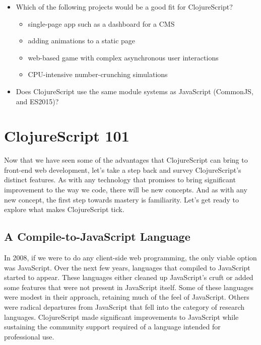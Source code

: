 \documentclass[10pt,twoside,openright]{memoir}
\begin{document}
\begin{itemize}
\tightlist
\item
  Which of the following projects would be a good fit for ClojureScript?

  \begin{itemize}
  \tightlist
  \item
    single-page app such as a dashboard for a CMS
  \item
    adding animations to a static page
  \item
    web-based game with complex asynchronous user interactions
  \item
    CPU-intensive number-crunching simulations
  \end{itemize}
\item
  Does ClojureScript use the same module systems as JavaScript
  (CommonJS, and ES2015)?
\end{itemize}

\section{ClojureScript 101}

Now that we have seen some of the advantages that ClojureScript can
bring to front-end web development, let's take a step back and survey
ClojureScript's distinct features. As with any technology that promises
to bring significant improvement to the way we code, there will be new
concepts. And as with any new concept, the first step towards mastery is
familiarity. Let's get ready to explore what makes ClojureScript tick.

\subsection{A Compile-to-JavaScript Language}

In 2008, if we were to do any client-side web programming, the only
viable option was JavaScript. Over the next few years, languages that
compiled to JavaScript started to appear. These languages either cleaned
up JavaScript's cruft or added some features that were not present in
JavaScript itself. Some of these languages were modest in their
approach, retaining much of the feel of JavaScript. Others were radical
departures from JavaScript that fell into the category of research
languages. ClojureScript made significant improvements to JavaScript
while sustaining the community support required of a language intended
for professional use. 
\end{document}
